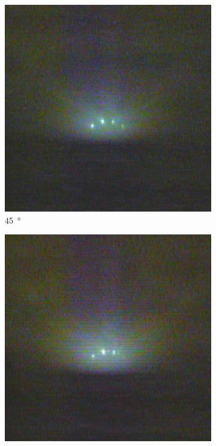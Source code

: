 \begin{figure}
    \begin{subfigure}{0.2\linewidth}
        \includegraphics[width=\textwidth]{../data/edited/1_2_52deg.pdf}
        \caption{\qty{45}{\degree}}
    \end{subfigure}
    \begin{subfigure}{0.2\linewidth}
        \includegraphics[width=\textwidth]{../data/edited/1_2_142deg.pdf}

\end{subfigure}
\end{figure}
